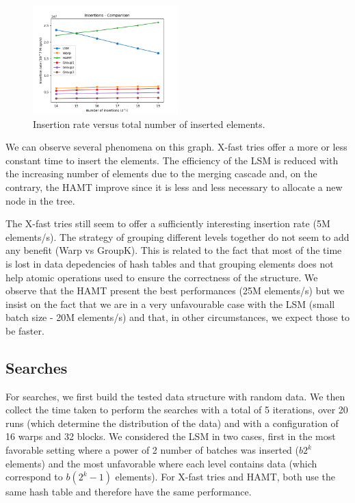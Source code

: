 \documentclass[conference]{IEEEtran}
\begin{document}
\begin{figure}[htbp]
\centerline{\includegraphics[width=0.5\textwidth]{InsertionRate1.png}}
\caption{Insertion rate versus total number of inserted elements.}
\label{InsertionRate}
\end{figure}

We can observe several phenomena on this graph. X-fast tries offer a more or less constant time to insert the elements. The efficiency of the LSM is reduced with the increasing number of elements due to the merging cascade and, on the contrary, the HAMT improve since it is less and less necessary to allocate a new node in the tree.

The X-fast tries still seem to offer a sufficiently interesting insertion rate (5M elements/s). The strategy of grouping different levels together do not seem to add any benefit (Warp vs GroupK). This is related to the fact that most of the time is lost in data depedencies of hash tables and that grouping elements does not help atomic operations used to ensure the correctness of the structure. We observe that the HAMT present the best performances (25M elements/s) but we insist on the fact that we are in a very unfavourable case with the LSM (small batch size - 20M elements/s) and that, in other circumstances, we expect those to be faster.

\subsection{Searches}

For searches, we first build the tested data structure with random data. We then collect the time taken to perform the searches with a total of 5 iterations, over 20 runs (which determine the distribution of the data) and with a configuration of 16 warps and 32 blocks. We considered the LSM in two cases, first in the most favorable setting where a power of 2 number of batches was inserted ($b2^{k}$ elements) and the most unfavorable where each level contains data (which correspond to $b(2^{k} - 1)$ elements). For X-fast tries and HAMT, both use the same hash table and therefore have the same performance.
\end{document}
